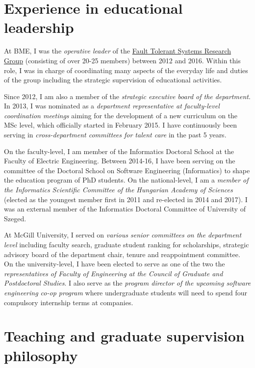 \documentclass[a4paper,11pt]{article}
\begin{document}
\section{Experience in educational leadership}
At BME, I was the \emph{operative leader} of the \href{http://inf.mit.bme.hu/en/}{Fault Tolerant Systems Research Group} (consisting of over 20-25 members) between 2012 and 2016. Within this role, I was in charge of coordinating many aspects of the everyday life and duties of the group including the strategic supervision of educational activities. 

Since 2012, I am also a member of the \emph{strategic executive board of the department}. In 2013, I was nominated as a \emph{department representative at faculty-level coordination meetings} aiming for the development of a new curriculum on the MSc level, which officially started in February 2015. I have continuously been serving in \emph{cross-department committees for talent care} in the past 5 years. 

On the faculty-level, I am member of the Informatics Doctoral School at the Faculty of Electric Engineering. Between 2014-16, I have been serving on the committee of the Doctoral School on Software Engineering (Informatics) to shape the education program of PhD students. On the national-level, I am a \emph{member of the Informatics Scientific Committee of the Hungarian Academy of Sciences} (elected as the youngest member first in 2011 and re-elected in 2014 and 2017). I was an external member of the Informatics Doctoral Committee of University of Szeged.

At McGill University, I served on \emph{various senior committees on the department level} including faculty search, graduate student ranking for scholarships, strategic advisory board of the department chair, tenure and reappointment committee. On the university-level, I have been elected to serve as one of the two the \emph{representatives of Faculty of Engineering at the Council of Graduate and Postdoctoral Studies}. I also serve as the \emph{program director of the upcoming software engineering co-op program } where undergraduate students will need to spend four compulsory internship terms at companies.

\section{Teaching and graduate supervision philosophy}
\end{document}
